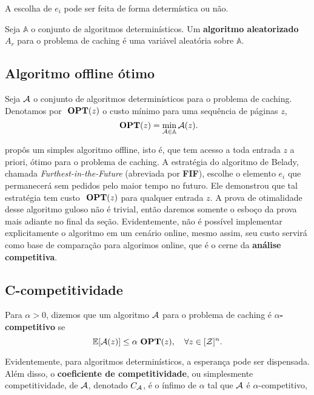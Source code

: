 A escolha de \(e_i\) pode ser feita de forma determística ou não. 

\begin{definition}
  Seja \(\mathbb{A}\) o conjunto de algoritmos determinísticos. Um \textbf{algoritmo aleatorizado} \(A_r\) para o problema de caching é uma variável aleatória sobre \(\mathbb{A}\). 
\end{definition}

\subsection{Algoritmo offline ótimo}

\begin{definition}
  Seja \(\mathcal{A}\) o conjunto de algoritmos determinísticos para o problema de caching. Denotamos por \(\ \textbf{OPT}(z)\) o custo mínimo para uma sequência de páginas \(z\),
  \begin{equation}
    \ \textbf{OPT}(z) = \min_{\mathcal{A} \in \mathbb{A}} \mathcal{A}(z).
  \end{equation}
\end{definition}

\textcite{Belady66} propôs um simples algoritmo offline, isto é, que tem acesso a toda entrada \(z\) a priori, ótimo para o problema de caching. A estratégia do algoritmo de Belady, chamada \textit{Furthest-in-the-Future} (abreviada por \textbf{FIF}), escolhe o elemento \(e_i\) que permanecerá sem pedidos pelo maior tempo no futuro. Ele demonstrou que tal estratégia tem custo \(\ \textbf{OPT}(z)\) para qualquer entrada \(z\). A prova de otimalidade desse algoritmo guloso não é trivial, então daremos somente o esboço da prova mais adiante no final da seção. Evidentemente, não é possível implementar explicitamente o algoritmo em um cenário online, mesmo assim, seu custo servirá como base de comparação para algorimos online, que é o cerne da \textbf{análise competitiva}.

\subsection{C-competitividade}

\begin{definition}
  \label{def:comp}
  Para \(\alpha > 0\), dizemos que um algoritmo \(\mathcal{A}\) para o problema de caching é \(\alpha\)\textbf{-competitivo} se
\begin{equation}
  \mathbb{E}[\mathcal{A}(z)] \le \alpha \ \textbf{OPT}(z), \quad \forall z \in [\mathcal{Z}]^n.
\end{equation}

Evidentemente, para algoritmos determinísticos, a esperança pode ser dispensada. Além disso, o \textbf{coeficiente de competitividade}, ou simplesmente competitividade, de \(\mathcal{A}\), denotado \(C_{\mathcal{A}}\), é o ínfimo de \(\alpha\) tal que \(\mathcal{A}\) é \(\alpha\)-competitivo,
\end{definition}


